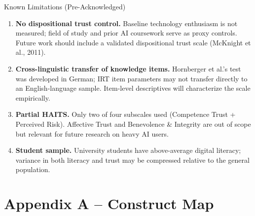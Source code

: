 \documentclass[10pt,aspectratio=169]{beamer}
\begin{document}
\begin{frame}{Known Limitations (Pre-Acknowledged)}
  \small
  \begin{enumerate}
    \item \textbf{No dispositional trust control.}
          Baseline technology enthusiasm is not measured; field of study and
          prior AI coursework serve as proxy controls. Future work should
          include a validated dispositional trust scale (McKnight et al., 2011).

    \item \textbf{Cross-linguistic transfer of knowledge items.}
          Hornberger et al.'s test was developed in German; IRT item parameters
          may not transfer directly to an English-language sample. Item-level
          descriptives will characterize the scale empirically.

    \item \textbf{Partial HAITS.}
          Only two of four subscales used (Competence Trust + Perceived Risk).
          Affective Trust and Benevolence \& Integrity are out of scope but
          relevant for future research on heavy AI users.

    \item \textbf{Student sample.}
          University students have above-average digital literacy; variance in
          both literacy and trust may be compressed relative to the general
          population.
  \end{enumerate}
\end{frame}

\section{Appendix A -- Construct Map}
\end{document}
